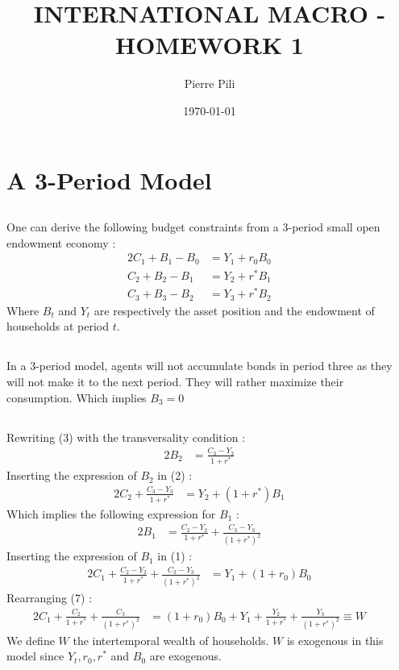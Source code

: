 \documentclass{article}
\title{INTERNATIONAL MACRO - HOMEWORK 1}
\author{Pierre Pili}
\date{\today}
\begin{document}
\begin{titlingpage}
\maketitle
\end{titlingpage}

\tableofcontents

\newpage
\section{A 3-Period Model}
\subsection{}
One can derive the following budget constraints from a 3-period small open endowment economy :
\begin{alignat}{2}
    C_1 + B_1 - B_0 &= Y_1 + r_0 B_0  \quad&\\
    C_2 + B_2 - B_1 &= Y_2 + r^* B_1  \quad&\\
    C_3 + B_3 - B_2 &= Y_3 + r^* B_2  \quad&
  \end{alignat}
Where $B_t$ and $Y_t$ are respectively the asset position and the endowment of households at period $t$.
\subsection{}
In a 3-period model, agents will not accumulate bonds in period three as they will not make it to the next period. They will rather maximize their consumption. Which implies $B_3 = 0$
\subsection{}
Rewriting (3) with the transversality condition :
\begin{alignat}{2}
    B_2 &= \frac{C_3 - Y_3}{1+r^*}  \quad&
\end{alignat}
Inserting the expression of $B_2$ in (2) :
\begin{alignat}{2}
    C_2 + \frac{C_3 - Y_3}{1+r^*} &= Y_2 + (1+r^*)B_1  \quad&
\end{alignat}
Which implies the following expression for $B_1$ :
\begin{alignat}{2}
    B_1 &= \frac{C_2 - Y_2}{1+r^*} + \frac{C_3 - Y_3}{(1+r^*)^2}  \quad&
\end{alignat}
Inserting the expression of $B_1$ in (1) :
\begin{alignat}{2}
    C_1 + \frac{C_2 - Y_2}{1+r^*} + \frac{C_3 - Y_3}{(1+r^*)^2} &= Y_1 + (1+r_0)B_0  \quad&
\end{alignat}
Rearranging (7) :
\begin{alignat}{2}
    C_1 + \frac{C_2}{1+r^*} + \frac{C_3}{(1+r^*)^2} &= (1+r_0)B_0 + Y_1 + \frac{Y_2}{1+r^*} + \frac{Y_3}{(1+r^*)^2} \equiv W \quad&
\end{alignat}
We define $W$ the intertemporal wealth of households. $W$ is exogenous in this model since $Y_t, r_0, r^*$ and $B_0$ are exogenous.
\end{document}
